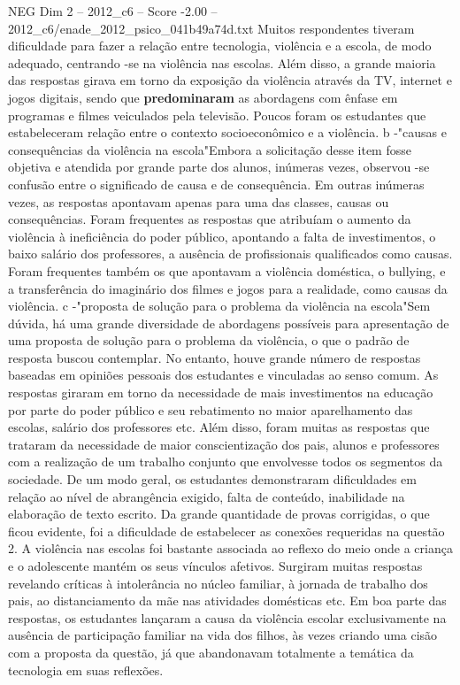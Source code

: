 \begin{textsample}{NEG Dim 2 – 2012\_c6 – Score -2.00 – 2012\_c6/enade\_2012\_psico\_041b49a74d.txt}
Muitos respondentes tiveram dificuldade para fazer a relação entre tecnologia, violência e a escola, de modo adequado, centrando -se na violência nas escolas.
Além disso, a grande maioria das respostas girava em torno da exposição da violência através da TV, internet e jogos digitais, sendo que \textbf{predominaram} as abordagens com ênfase em programas e filmes veiculados pela televisão.
Poucos foram os estudantes que estabeleceram relação entre o contexto socioeconômico e a violência. b -"causas e consequências da violência na escola"Embora a solicitação desse item fosse objetiva e atendida por grande parte dos alunos, inúmeras vezes, observou -se confusão entre o significado de causa e de consequência.
Em outras inúmeras vezes, as respostas apontavam apenas para uma das classes, causas ou consequências.
Foram frequentes as respostas que atribuíam o aumento da violência à ineficiência do poder público, apontando a falta de investimentos, o baixo salário dos professores, a ausência de profissionais qualificados como causas.
Foram frequentes também os que apontavam a violência doméstica, o bullying, e a transferência do imaginário dos filmes e jogos para a realidade, como causas da violência. c -"proposta de solução para o problema da violência na escola"Sem dúvida, há uma grande diversidade de abordagens possíveis para apresentação de uma proposta de solução para o problema da violência, o que o padrão de resposta buscou contemplar.
No entanto, houve grande número de respostas baseadas em opiniões pessoais dos estudantes e vinculadas ao senso comum.
As respostas giraram em torno da necessidade de mais investimentos na educação por parte do poder público e seu rebatimento no maior aparelhamento das escolas, salário dos professores etc.
Além disso, foram muitas as respostas que trataram da necessidade de maior conscientização dos pais, alunos e professores com a realização de um trabalho conjunto que envolvesse todos os segmentos da sociedade.
De um modo geral, os estudantes demonstraram dificuldades em relação ao nível de abrangência exigido, falta de conteúdo, inabilidade na elaboração de texto escrito.
Da grande quantidade de provas corrigidas, o que ficou evidente, foi a dificuldade de estabelecer as conexões requeridas na questão 2.
A violência nas escolas foi bastante associada ao reflexo do meio onde a criança e o adolescente mantém os seus vínculos afetivos.
Surgiram muitas respostas revelando críticas à intolerância no núcleo familiar, à jornada de trabalho dos pais, ao distanciamento da mãe nas atividades domésticas etc.
Em boa parte das respostas, os estudantes lançaram a causa da violência escolar exclusivamente na ausência de participação familiar na vida dos filhos, às vezes criando uma cisão com a proposta da questão, já que abandonavam totalmente a temática da tecnologia em suas reflexões.

\end{textsample}
